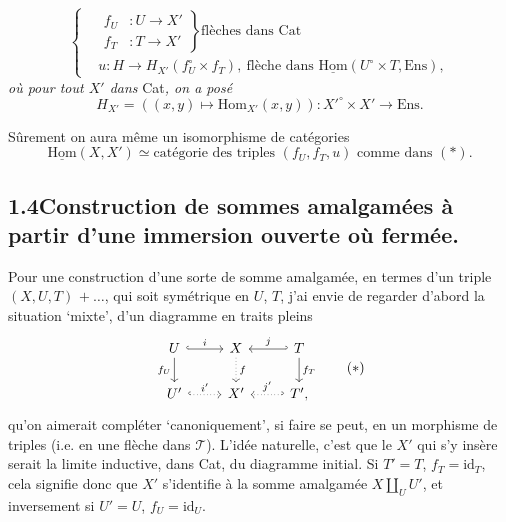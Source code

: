 \documentclass[11pt]{article}
\newcommand{\printedpage}[1]{\marginpar{\footnotesize p.~#1}}
\newcommand{\msp}[1]{\marginpar{\footnotesize [#1]}}
\newcommand{\Hom}{\mathrm{Hom}}
\newcommand{\uHom}{\underline{\mathrm{Hom}}}
\newcommand{\Ens}{\mathrm{Ens}}
\newcommand{\id}{\mathrm{id}}
\begin{document}
\printedpage{48}

\[
\left\{
\begin{aligned}
&\left.\begin{aligned} f_U &: U \longrightarrow X' \\ f_T &: T \longrightarrow X' \end{aligned}\right\}\text{flèches dans Cat}\\
&u : H \longrightarrow H_{X'}(f_U^{\circ}\times f_T),\ \text{flèche dans } \uHom(U^{\circ}\times T,\Ens),
\end{aligned}
\right.
\tag*{}
\]
\textit{où pour tout $X'$ dans} Cat\textit{, on a posé}
\[
H_{X'} = ((x,y)\longmapsto \Hom_{X'}(x,y)) : X'^{\circ}\times X' \longrightarrow \Ens.
\]

Sûrement on aura même un isomorphisme de catégories
\[
\uHom(X,X') \simeq \text{catégorie des triples } (f_U,f_T,u) \text{ comme dans } (*).
\]

\subsection*{1.4\quad Construction de sommes amalgamées à partir d'une immersion ouverte où fermée.} %

Pour une construction d'une sorte de somme amalgamée, en termes d'un triple $(X,U,T)$ $+\ \ldots$, \msp{page 67} qui soit symétrique en $U$, $T$, j'ai envie de regarder d'abord la situation ‘mixte’, d'un diagramme en traits pleins
\[
\begin{tikzcd}
U \arrow[r, hook, "i"] \arrow[d, "f_U"'] & X \arrow[d, dotted, "f"] & T \arrow[l, hook', "j"'] \arrow[d, "f_T"] \\
U' \arrow[r, hook, dotted, "i'"] & X' & T', \arrow[l, hook', dotted, "j'"']
\end{tikzcd}
\tag*{$(*)$}
\]
qu'on aimerait compléter ‘canoniquement’, si faire se peut, en un morphisme de triples (i.e. en une flèche dans $\mathcal{T}$). L'idée naturelle, c'est que le $X'$ qui s'y insère serait la limite inductive, dans Cat, du diagramme initial. Si $T'=T$, $f_T=\id_T$, cela signifie donc que $X'$ s'identifie à la somme amalgamée $X\amalg_U U'$, et inversement si $U'=U$, $f_U=\id_U$.
\end{document}
